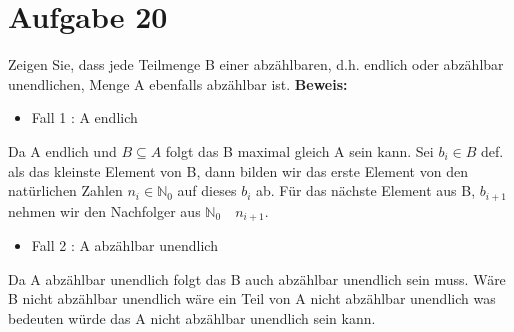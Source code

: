 \documentclass[paper = a4, ngerman]{scrartcl}
\begin{document}
	\section*{Aufgabe 20}
	Zeigen Sie, dass jede Teilmenge B einer abzählbaren, d.h. endlich oder abzählbar unendlichen, Menge A ebenfalls abzählbar ist.
	\textbf{Beweis:}
	\begin{itemize}
		\item Fall 1 : A endlich
	\end{itemize}
		Da A endlich und $B \subseteq A$  folgt das B maximal gleich A sein kann. Sei $b_i \in B$ def. als das kleinste Element von B, dann bilden wir das erste Element von den natürlichen Zahlen $n_i \in \mathbb{N}_{0}$ auf dieses $b_i$ ab. Für das nächste Element aus B, $b_{i+1}$ nehmen wir den Nachfolger aus $\mathbb{N}_{0}\quad n_{i+1}$.
	\begin{itemize}
		\item Fall 2 : A abzählbar unendlich
	\end{itemize}
		Da A abzählbar unendlich folgt das B auch abzählbar unendlich sein muss. Wäre B nicht abzählbar unendlich wäre ein Teil von A nicht abzählbar unendlich was bedeuten würde das A nicht abzählbar unendlich sein kann.
	
	
\end{document}
